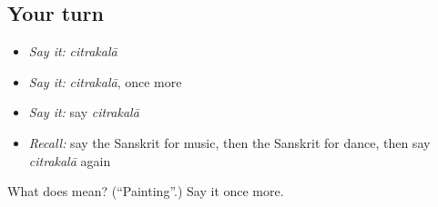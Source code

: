\subsection*{Your turn}
\begin{itemize}
\raggedright
  \item \emph{Say it:} \emph{citrakalā}
  \item \emph{Say it:} \emph{citrakalā}, once more
  \item \emph{Say it:} say \emph{citrakalā}
  \item \emph{Recall:} say the Sanskrit for music, then the Sanskrit for dance, then say \emph{citrakalā} again
\end{itemize}

\begin{tcolorbox}[breakable,colback=teal!4,colframe=teal!35!black,title={Before you move on}]
What does  mean? (\textquotedblleft{}Painting\textquotedblright{}.) Say it once more.
\end{tcolorbox}
